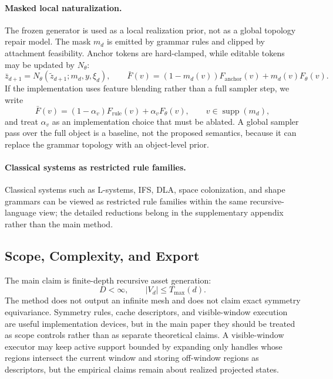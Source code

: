 \paragraph{Masked local naturalization.}
The frozen generator is used as a local realization prior, not as a global topology repair model. The mask $m_d$ is emitted by grammar rules and clipped by attachment feasibility. Anchor tokens are hard-clamped, while editable tokens may be updated by $N_{\theta}$:
\[
\bar z_{d+1}=N_{\theta}(\tilde z_{d+1};m_d,y,\xi_d),
\qquad
\bar F(v)=
(1-m_d(v))F_{\mathrm{anchor}}(v)
+ 
m_d(v)F_{\theta}(v).
\]
If the implementation uses feature blending rather than a full sampler step, we write
\[
\bar F(v)=
(1-\alpha_v)F_{\mathrm{rule}}(v)+\alpha_v F_{\theta}(v),
\qquad v\in\operatorname{supp}(m_d),
\]
and treat $\alpha_v$ as an implementation choice that must be ablated. A global sampler pass over the full object is a baseline, not the proposed semantics, because it can replace the grammar topology with an object-level prior.  

\paragraph{Classical systems as restricted rule families.}
Classical systems such as L-systems, IFS, DLA, space colonization, and shape grammars can be viewed as restricted rule families within the same recursive-language view; the detailed reductions belong in the supplementary appendix rather than the main method.

\subsection{Scope, Complexity, and Export}
The main claim is finite-depth recursive asset generation:
\[
D<\infty,\qquad |V_d|\le T_{\max}(d).
\]
The method does not output an infinite mesh and does not claim exact symmetry equivariance. Symmetry rules, cache descriptors, and visible-window execution are useful implementation devices, but in the main paper they should be treated as scope controls rather than as separate theoretical claims. A visible-window executor may keep active support bounded by expanding only handles whose regions intersect the current window and storing off-window regions as descriptors, but the empirical claims remain about realized projected states.

